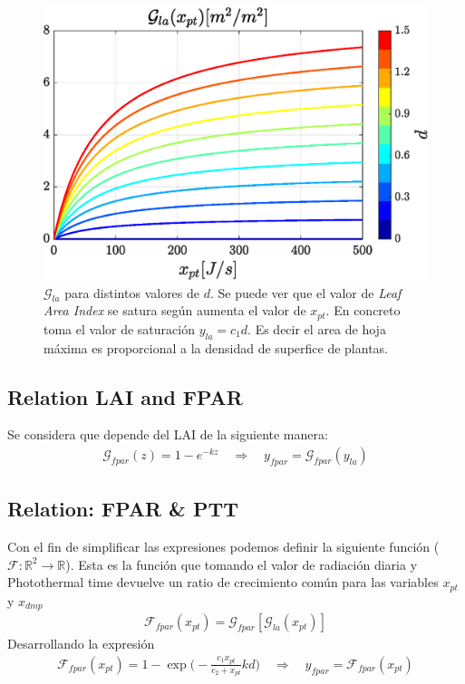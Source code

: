 \begin{figure}
    \centering
    \includegraphics[scale=0.5]{img/gla.eps}
    \caption{$\mathcal{G}_{la}$ para distintos valores de $d$. Se puede ver que el valor de \emph{Leaf Area Index} se satura según aumenta el valor de $x_{pt}$. En concreto toma el valor de saturación  $y_{la} = c_1d$. Es decir el area de hoja máxima es proporcional a la densidad de superfice de plantas.}
    \label{fig:Gla}
\end{figure}
    
\subsection{Relation LAI and FPAR}

Se considera que depende del LAI de la siguiente manera:
\begin{gather}
    \mathcal{G}_{fpar}(z) = 1 - e^{-k z}
    \hspace{1em} \Rightarrow \hspace{1em}
    y_{fpar} = \mathcal{G}_{fpar}(y_{la})
\end{gather}


\subsection{Relation: FPAR \& PTT}

Con el fin de simplificar las expresiones podemos definir la siguiente función ($\mathcal{F}: \mathbb{R}^2 \rightarrow \mathbb{R}$). Esta es la función que tomando el valor de radiación diaria y Photothermal time devuelve un ratio de crecimiento común para las variables $x_{pt}$ y $x_{dmp}$
\begin{gather}
    \mathcal{F}_{fpar}(x_{pt}) =   \mathcal{G}_{fpar}[ \mathcal{G}_{la}(x_{pt})]
\end{gather}
Desarrollando la expresión
\begin{gather}
    \mathcal{F}_{fpar}(x_{pt}) =   
        1- \exp \Big(-\frac{c_1x_{pt}}{c_2+x_{pt}} kd\Big)
        \hspace{1em} 
        \Rightarrow 
        \hspace{1em} 
        y_{fpar} = \mathcal{F}_{fpar}(x_{pt})
\end{gather}

